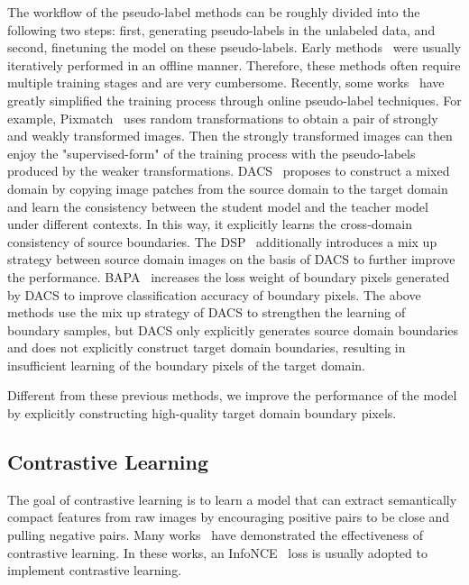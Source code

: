 \documentclass[sigconf]{acmart}
\begin{document}
		The workflow of the pseudo-label methods can be roughly divided into the following two steps: first, generating pseudo-labels in the unlabeled data, and second, finetuning the model on these pseudo-labels. Early methods~\citep{zou2018unsupervised, zou2019confidence,feng2020dmt,feng2020semi} were usually iteratively performed in an offline manner. Therefore, these methods often require multiple training stages and are very cumbersome.
		Recently, some works~\cite{tranheden2021dacs,melas2021pixmatch,zhou2021domain,xu2019self} have greatly simplified the training process through online pseudo-label techniques. For example, Pixmatch~\cite{melas2021pixmatch} uses random transformations to obtain a pair of strongly and weakly transformed images. Then the strongly transformed images can then enjoy the "supervised-form" of the training process with the pseudo-labels produced by the weaker transformations. DACS~\cite{tranheden2021dacs} proposes to construct a mixed domain by copying image patches from the source domain to the target domain and learn the consistency between the student model and the teacher model under different contexts. In this way, it explicitly learns the cross-domain consistency of source boundaries.
		The DSP~\cite{gao2021dsp} additionally introduces a mix up strategy between source domain images on the basis of DACS to further improve the performance. BAPA~\cite{liu2021bapa} increases the loss weight of boundary pixels generated by DACS to improve classification accuracy of boundary pixels. The above methods use the mix up strategy of DACS to strengthen the learning of boundary samples, but DACS only explicitly generates source domain boundaries and does not explicitly construct target domain boundaries, resulting in insufficient learning of the boundary pixels of the target domain.
		
		Different from these previous methods, we improve the performance of the model by explicitly constructing high-quality target domain boundary pixels. 
		
		
		\subsection{Contrastive Learning}
		The goal of contrastive learning is to learn a model that can extract semantically compact features from raw images by encouraging positive pairs to be close and pulling negative pairs.
		Many works~\cite{chen2020simple, he2020momentum, grill2020bootstrap, caron2020unsupervised,zhang2022low,li2021semantic} have demonstrated the effectiveness of contrastive learning. In these works, an InfoNCE~\citep{oord2018representation} loss is usually adopted to implement contrastive learning.
		
\end{document}
